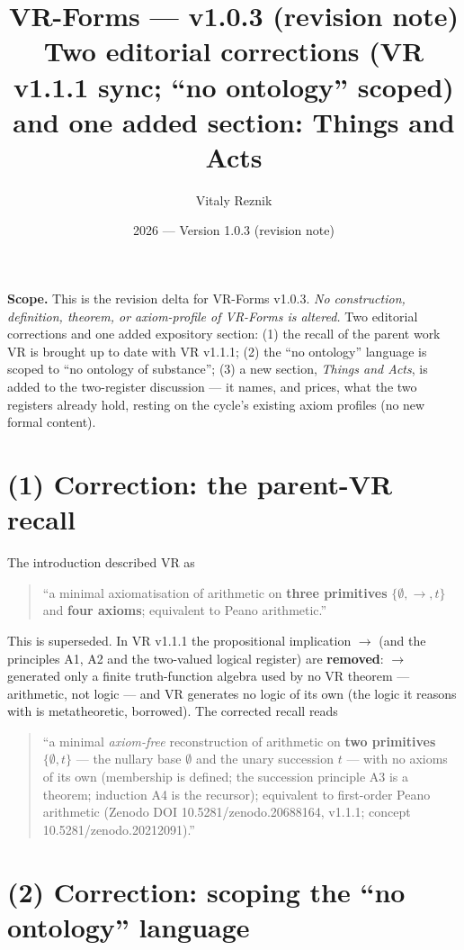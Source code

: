 \documentclass[11pt]{article}
\title{\textbf{VR-Forms --- v1.0.3 (revision note)}\\[2pt]
\large Two editorial corrections (VR v1.1.1 sync; ``no ontology'' scoped) and one added section: Things and Acts}
\author{Vitaly Reznik}
\date{2026 --- Version 1.0.3 (revision note)}
\begin{document}
\maketitle

\noindent\textbf{Scope.} This is the revision delta for VR-Forms v1.0.3. \emph{No construction,
definition, theorem, or axiom-profile of VR-Forms is altered.} Two editorial corrections and one
added expository section: (1) the recall of the parent work VR is brought up to date with VR v1.1.1;
(2) the ``no ontology'' language is scoped to ``no ontology of substance''; (3) a new section,
\emph{Things and Acts}, is added to the two-register discussion --- it names, and prices, what the
two registers already hold, resting on the cycle's existing axiom profiles (no new formal content).

\section*{(1) Correction: the parent-VR recall}

The introduction described VR as

\begin{quote}
``a minimal axiomatisation of arithmetic on \textbf{three primitives} $\{\emptyset,\to,t\}$ and
\textbf{four axioms}; equivalent to Peano arithmetic.''
\end{quote}

This is superseded. In VR v1.1.1 the propositional implication $\to$ (and the principles A1, A2 and
the two-valued logical register) are \textbf{removed}: $\to$ generated only a finite truth-function
algebra used by no VR theorem --- arithmetic, not logic --- and VR generates no logic of its own
(the logic it reasons with is metatheoretic, borrowed). The corrected recall reads

\begin{quote}
``a minimal \emph{axiom-free} reconstruction of arithmetic on \textbf{two primitives}
$\{\emptyset, t\}$ --- the nullary base $\emptyset$ and the unary succession $t$ --- with no axioms
of its own (membership is defined; the succession principle A3 is a theorem; induction A4 is the
recursor); equivalent to first-order Peano arithmetic
(Zenodo DOI 10.5281/zenodo.20688164, v1.1.1; concept 10.5281/zenodo.20212091).''
\end{quote}

\section*{(2) Correction: scoping the ``no ontology'' language}
\end{document}
